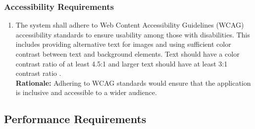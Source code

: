 \documentclass[]{article}
\begin{document}
\subsubsection{Accessibility Requirements}
\label{ssub:accessibility_requirements}
\begin{enumerate}[{UH-A}1. ]
	\item The system shall adhere to Web Content Accessibility Guidelines (WCAG) accessibility standards to ensure usability among those with disabilities. This includes providing
	      alternative text for images and using sufficient color contrast between text and background elements. Text should have a color contrast ratio of at least 4.5:1 and larger text should
	      have at least 3:1 contrast ratio \cite{2c}. \\
	      {\bf Rationale:} Adhering to WCAG standards would ensure that the application is inclusive and accessible to a wider audience.
\end{enumerate}



\subsection{Performance Requirements}
\label{sub:performance_requirements}
\end{document}
